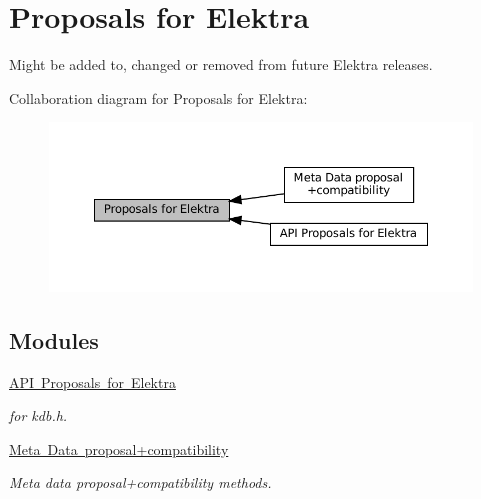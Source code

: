 \hypertarget{group__proposal}{}\section{Proposals for Elektra}
\label{group__proposal}


Might be added to, changed or removed from future Elektra releases.  


Collaboration diagram for Proposals for Elektra\+:
\nopagebreak
\begin{figure}[H]
\begin{center}
\leavevmode
\includegraphics[width=350pt]{group__proposal}
\end{center}
\end{figure}
\subsection*{Modules}
\begin{DoxyCompactItemize}
\item 
\mbox{\hyperlink{group__api}{A\+P\+I Proposals for Elektra}}
\begin{DoxyCompactList}\small\item\em for kdb.\+h. \end{DoxyCompactList}\item 
\mbox{\hyperlink{group__meta}{Meta Data proposal+compatibility}}
\begin{DoxyCompactList}\small\item\em Meta data proposal+compatibility methods. \end{DoxyCompactList}\end{DoxyCompactItemize}
